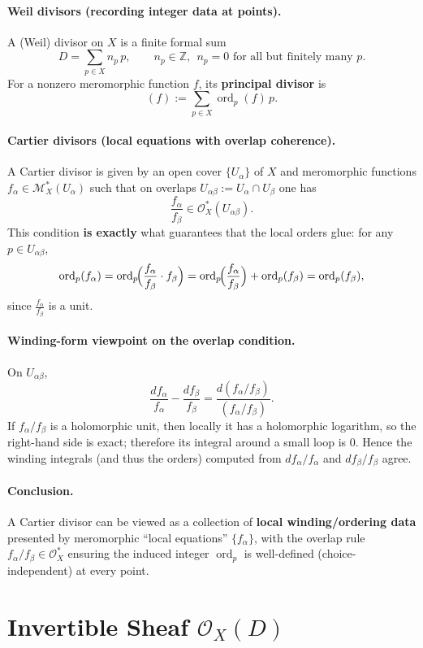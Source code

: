 \documentclass[11pt,openany]{article}
\renewcommand{\emph}[1]{\textbf{#1}}
\newcommand{\ord}{\operatorname{ord}}
\begin{document}
\paragraph{Weil divisors (recording integer data at points).}
A (Weil) divisor on $X$ is a finite formal sum
\[
D=\sum_{p\in X} n_p\,p,\qquad n_p\in\mathbb Z,\ \ n_p=0\text{ for all but finitely many }p.
\]
For a nonzero meromorphic function $f$, its \emph{principal divisor} is
\[
(f):=\sum_{p\in X}\ord_p(f)\,p.
\]

\paragraph{Cartier divisors (local equations with overlap coherence).}
A Cartier divisor is given by an open cover $\{U_\alpha\}$ of $X$ and meromorphic functions
$f_\alpha\in \mathcal M_X^*(U_\alpha)$ such that on overlaps
$U_{\alpha\beta}:=U_\alpha\cap U_\beta$ one has
\[
\frac{f_\alpha}{f_\beta}\in \mathcal O_X^*(U_{\alpha\beta}).
\]
This condition \emph{is exactly} what guarantees that the local orders glue:
for any $p\in U_{\alpha\beta}$,
\[
\ord_p(f_\alpha)=\ord_p\!\Bigl(\frac{f_\alpha}{f_\beta}\cdot f_\beta\Bigr)
=\ord_p\!\Bigl(\frac{f_\alpha}{f_\beta}\Bigr)+\ord_p(f_\beta)=\ord_p(f_\beta),
\]
since $\frac{f_\alpha}{f_\beta}$ is a unit.

\paragraph{Winding-form viewpoint on the overlap condition.}
On $U_{\alpha\beta}$,
\[
\frac{df_\alpha}{f_\alpha}-\frac{df_\beta}{f_\beta}
=\frac{d(f_\alpha/f_\beta)}{(f_\alpha/f_\beta)}.
\]
If $f_\alpha/f_\beta$ is a holomorphic unit, then locally it has a holomorphic logarithm,
so the right-hand side is exact; therefore its integral around a small loop is $0$.
Hence the winding integrals (and thus the orders) computed from $df_\alpha/f_\alpha$
and $df_\beta/f_\beta$ agree.

\paragraph{Conclusion.}
A Cartier divisor can be viewed as a collection of \emph{local winding/ordering data}
presented by meromorphic ``local equations'' $\{f_\alpha\}$, with the overlap rule
$f_\alpha/f_\beta\in\mathcal O_X^*$ ensuring the induced integer $\ord_p$ is
well-defined (choice-independent) at every point.

\newpage
\section{Invertible Sheaf $\mathcal{O}_X(D)$}
\end{document}

